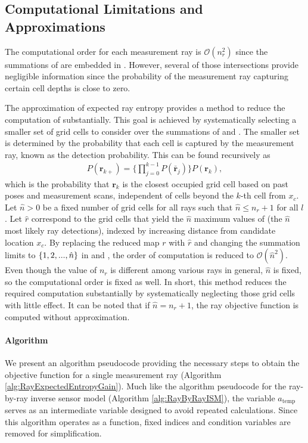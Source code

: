 \subsection{Computational Limitations and Approximations}

The computational order for each measurement ray is $\mathcal O(n_{r}^2)$ since the summations of  are embedded in . However, several of those intersections provide negligible information since the probability of the measurement ray capturing certain cell depths is close to zero.

The approximation of expected ray entropy provides a method to reduce the computation of  substantially. This goal is achieved by systematically selecting a smaller set of grid cells to consider over the summations of  and .
The smaller set is determined by the probability that each cell is captured by the measurement ray, known as the detection probability. This can be found recursively as
\begin{align}
\label{eqn:ProbOfFirstCell}
P(\mathbf{r}_{k+})%
=\bigg\{\prod_{j=0}^{k-1}P(\bar{\mathbf{r}}_{j})\bigg\}P(\mathbf{r}_{k}),
\end{align}
which is the probability that $\mathbf{r}_{k}$ is the closest occupied grid cell based on past poses and measurement scans, independent of cells beyond the $k$-th cell from $x_c$.
Let $\hat n>0$ be a fixed number of grid cells for all rays such that $\hat n\leq n_{r}+1$ for all $l$.
Let $\hat{r}$ correspond to the grid cells that yield the $\hat{n}$ maximum values of  (the $\hat n$ most likely ray detections), indexed by increasing distance from candidate location $x_c$.
By replacing the reduced map $r$ with $\hat{r}$ and changing the summation limits to $\left\{ 1,2,...,\hat n \right\}$ in  and , the order of computation is reduced to $\mathcal O({\hat{n}}^2)$.
Even though the value of $n_{r}$ is different among various rays in general, $\hat n$ is fixed, so the computational order is fixed as well.
In short, this method reduces the required computation substantially by systematically neglecting those grid cells with little effect. It can be noted that if $\hat n=n_{r}+1$, the ray objective function is computed without approximation.


\paragraph{Algorithm} We present an algorithm pseudocode providing the necessary steps to obtain the objective function for a single measurement ray (Algorithm \ref{alg:RayExpectedEntropyGain}). Much like the algorithm pseudocode for the ray-by-ray inverse sensor model (Algorithm \ref{alg:RayByRayISM}), the variable $a_\text{temp}$ serves as an intermediate variable designed to avoid repeated calculations.
Since this algorithm operates as a function, fixed indices and condition variables are removed for simplification. 

